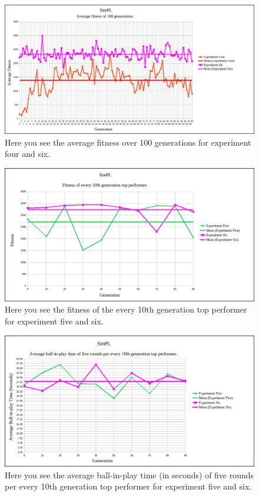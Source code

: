 \documentclass[a4paper,10pt]{article}
\begin{document}
\begin{figure}[H]  
  \centering
  \includegraphics[width=1\textwidth]{figures/exp46_avg_fit.png}
  \caption{Here you see the average fitness over 100 generations for experiment four and six.}
  \label{fig:exp46_avg_fit}
\end{figure}

\begin{figure}[H]  
  \centering
  \includegraphics[width=1\textwidth]{figures/exp56_10_tops.png}
  \caption{Here you see the fitness of the every 10th generation top performer for experiment five and six.}
  \label{fig:exp56_10_tops}
\end{figure}

\begin{figure}[H]  
  \centering
  \includegraphics[width=1\textwidth]{figures/exp56_10_tops_times.png}
  \caption{Here you see the average ball-in-play time (in seconds) of five rounds per every 10th generation top performer for experiment five and six.}
  \label{fig:exp56_10_tops_times}
\end{figure}
\end{document}
